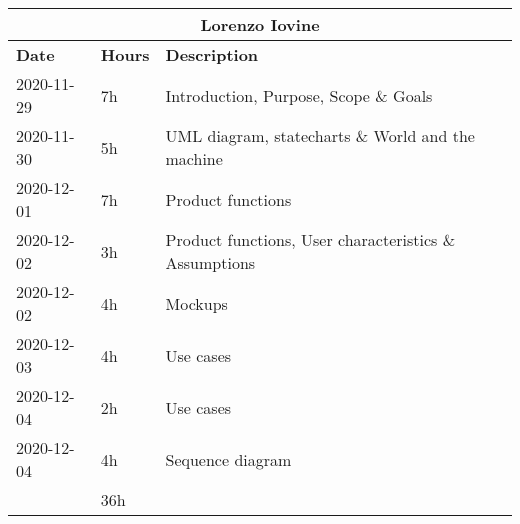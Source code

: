 \begin{table}[H]
    \centering
    \begin{tabular}{|l|l|l|}
        \multicolumn{3}{c}{\textbf{Lorenzo Iovine}}                   \\
        \hline
        \textbf{Date} & \textbf{Hours} & \textbf{Description}          \\\hline
        2020-11-29    & 7h             & Introduction, Purpose, Scope \& Goals                  \\\hline
        2020-11-30    & 5h             & UML diagram, statecharts \& World and the machine      \\\hline
        2020-12-01    & 7h             & Product functions                                      \\\hline
        2020-12-02    & 3h             & Product functions, User characteristics \& Assumptions \\\hline
        2020-12-02    & 4h             & Mockups                                                \\\hline
        2020-12-03    & 4h             & Use cases                                              \\\hline
        2020-12-04    & 2h             & Use cases                                              \\\hline
        2020-12-04    & 4h             & Sequence diagram                                       \\\hline\hline
                      & 36h            &                                                        \\\hline
    \end{tabular}
\end{table}
